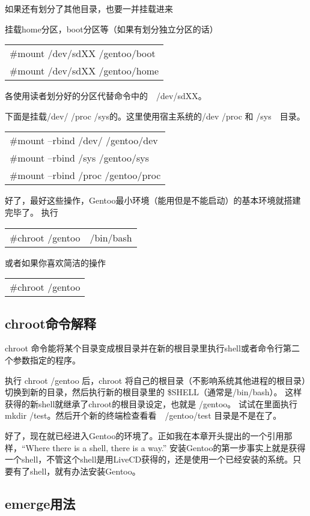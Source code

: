 \documentclass[amstex,twoside]{ctexbook}
\newenvironment{insertnote}{ \ttfamily\CJKfamily{KaiTi} }{\vskip 0.5cm }
\newenvironment{code}{\small\tt\begin{longtable}{p{0.8\textwidth}}}{\end{longtable}}
\begin{document}
如果还有划分了其他目录，也要一并挂载进来

挂载home分区，boot分区等（如果有划分独立分区的话）
\begin{code}
\#mount /dev/sdXX /gentoo/boot\\
\#mount /dev/sdXX /gentoo/home
\end{code}

各使用读者划分好的分区代替命令中的　/dev/sdXX。

下面是挂载/dev/ /proc /sys的。这里使用宿主系统的/dev /proc 和 /sys　目录。
\begin{code}
\#mount --rbind /dev/ /gentoo/dev\\
\#mount --rbind /sys /gentoo/sys\\
\#mount --rbind /proc /gentoo/proc
\end{code}

好了，最好这些操作，Gentoo最小环境（能用但是不能启动）的基本环境就搭建完毕了。
执行

\begin{code}
\#chroot /gentoo　/bin/bash
\end{code}
或者如果你喜欢简洁的操作
\begin{code}
\#chroot /gentoo
\end{code}

\begin{insertnote}
\subsection*{chroot命令解释}

chroot 命令能将某个目录变成根目录并在新的根目录里执行shell或者命令行第二个参数指定的程序。

执行 chroot /gentoo 后，chroot 将自己的根目录（不影响系统其他进程的根目录）切换到新的目录，然后执行新的根目录里的 \$SHELL（通常是/bin/bash）。
这样获得的新shell就继承了chroot的根目录设定，也就是 /gentoo。 试试在里面执行　mkdir /test。然后开个新的终端检查看看　/gentoo/test 目录是不是在了。
\end{insertnote}


好了，现在就已经进入Gentoo的环境了。正如我在本章开头提出的一个引用那样，“Where there is a shell, there is a way.” 安装Gentoo的第一步事实上就是获得一个shell，不管这个shell是用LiveCD获得的，还是使用一个已经安装的系统。只要有了shell，就有办法安装Gentoo。

\subsection{emerge用法}
\end{document}
